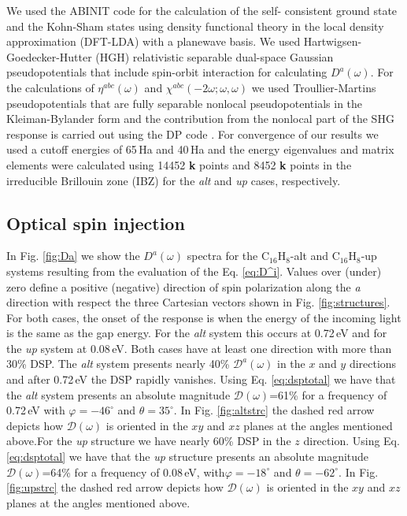 \documentclass[pss]{wiley2sp} %
\begin{document}
We used the ABINIT code \cite{gonzeCPC09} for the calculation of the self-
consistent ground state and the Kohn-Sham states using density functional
theory in the local density approximation (DFT-LDA) with a planewave basis. We
used Hartwigsen-Goedecker-Hutter (HGH) relativistic separable dual-space
Gaussian pseudopotentials \cite{hartwigsenPRB98}that include spin-orbit
interaction for calculating $D^{a}(\omega)$. For the calculations of
{$\eta^{abc}(\omega)$} and $\chi^{abc}(-2\omega;\omega,\omega)$ we used
Troullier-Martins pseudopotentials \cite{troullierPRB91} that are fully
separable nonlocal pseudopotentials in the Kleiman-Bylander form
\cite{kleinmanPRL82} and the contribution from the nonlocal part of the SHG
response is carried out using the DP code \cite{olevanoDP}. For convergence of our results we used a cutoff energies of 65\,Ha and 40\,Ha and the energy eigenvalues and matrix elements were calculated using 14452 \textbf{k} points and 8452 \textbf{k} points in the irreducible Brillouin zone (IBZ) for the \emph{alt} and \emph{up} cases, respectively.


\subsection{Optical spin injection}\label{subsec:results-DSP}

In Fig. \ref{fig:Da} we show the $D^{a}(\omega)$ spectra for the
C$_{16}$H$_{8}$-alt and C$_{16}$H$_{8}$-up systems resulting from the
evaluation of the Eq. \eqref{eq:D^i}. Values over (under) zero define a
positive (negative) direction of spin polarization along the \emph{a}
direction with respect the three Cartesian vectors shown in Fig.
\ref{fig:structures}. For both cases, the onset of the response is when the
energy of the incoming light is the same as the gap energy. For the \emph{alt}
system this occurs at 0.72\,eV and for the \emph{up} system at 0.08\,eV. Both
cases have at least one direction with more than 30\% DSP. The \emph{alt} system
presents nearly 40\% $\mathcal{D}^{a}(\omega)$ in the $x$ and $y$ directions and
after 0.72\,eV the DSP rapidly vanishes. Using Eq. \eqref{eq:dsptotal} we have
that the \emph{alt} system presents an absolute magnitude $\mathcal{D}(\omega)$=61\% for a
frequency of 0.72\,eV with $\varphi=-46^{\circ}$ and $\theta=35^{\circ}$. In
Fig. \ref{fig:altstrc} the dashed red arrow depicts how $\mathcal{D}(\omega)$ is
oriented in the $xy$ and $xz$ planes at the angles mentioned above.For the
\emph{up} structure we have nearly 60\% DSP in the $z$ direction. Using Eq.
\eqref{eq:dsptotal} we have that the \emph{up} structure presents an absolute magnitude
$\mathcal{D}(\omega)$=64\% for a frequency of 0.08\,eV,
with$\varphi=-18^{\circ}$ and $\theta=-62^{\circ}$. In Fig. \ref{fig:upstrc} the
dashed red arrow depicts how $\mathcal{D}(\omega)$ is oriented in the $xy$ and
$xz$ planes at the angles mentioned above.
\end{document}
